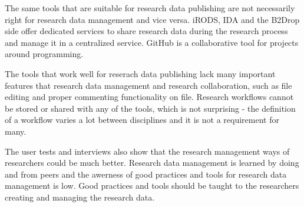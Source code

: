 The same tools that are suitable for research data publishing are not
necessarily right for research data management and vice versa. iRODS, IDA
and the B2Drop side offer dedicated services to share research data during
the research process and manage it in a centralized service. GitHub is a
collaborative tool for projects around programming.

The tools that work well for reserach data publishing lack many important
features that research data management and research collaboration, such
as file editing and proper commenting functionality on file. Research workflows
cannot be stored or shared with any of the tools, which is not surprising - the
definition of a workflow varies a lot between disciplines and it is not a
requirement for many.

The user tests and interviews also show that the research management ways
of researchers could be much better. Research data management is learned
by doing and from peers and the awerness of good practices and tools for
research data management is low. Good practices and tools should be taught to
the researchers creating and managing the research data.


